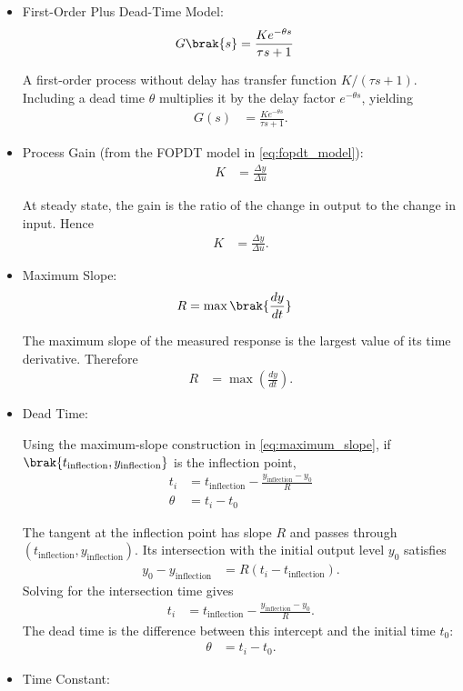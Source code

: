 \begin{enumerate}[label=\thesubsection.\arabic*, ref=\thesubsection.\theenumi,itemsep=0pt]
\begin{itemize}
\item First-Order Plus Dead-Time Model:
\begin{align}
G\brak{s}
&= \frac{Ke^{-\theta s}}{\tau s+1}
\label{eq:fopdt_model}
\end{align}


\solution
A first-order process without delay has transfer function $K/(\tau s+1)$. Including a dead time $\theta$ multiplies it by the delay factor $e^{-\theta s}$, yielding
\begin{align}
G(s)&=\frac{Ke^{-\theta s}}{\tau s+1}.
\end{align}
\item Process Gain (from the FOPDT model in \eqref{eq:fopdt_model}):
\begin{align}
K
&= \frac{\Delta y}{\Delta u}
\label{eq:process_gain}
\end{align}


\solution
At steady state, the gain is the ratio of the change in output to the change in input. Hence
\begin{align}
K&=\frac{\Delta y}{\Delta u}.
\end{align}
\item Maximum Slope:
\begin{align}
R
&= \max\brak{\frac{dy}{dt}}
\label{eq:maximum_slope}
\end{align}


\solution
The maximum slope of the measured response is the largest value of its time derivative. Therefore
\begin{align}
R&=\max\left(\frac{dy}{dt}\right).
\end{align}
\item Dead Time:

Using the maximum-slope construction in \eqref{eq:maximum_slope}, if $\brak{t_{\mathrm{inflection}},y_{\mathrm{inflection}}}$ is the inflection point,
\begin{align}
t_i
&= t_{\mathrm{inflection}}
-\frac{y_{\mathrm{inflection}}-y_0}{R}
\label{eq:dead_time_tangent}\\
\theta
&= t_i-t_0
\label{eq:dead_time}
\end{align}


\solution
The tangent at the inflection point has slope $R$ and passes through $(t_{\mathrm{inflection}},y_{\mathrm{inflection}})$. Its intersection with the initial output level $y_0$ satisfies
\begin{align}
y_0-y_{\mathrm{inflection}}
&=R(t_i-t_{\mathrm{inflection}}).
\end{align}
Solving for the intersection time gives
\begin{align}
t_i&=t_{\mathrm{inflection}}-\frac{y_{\mathrm{inflection}}-y_0}{R}.
\end{align}
The dead time is the difference between this intercept and the initial time $t_0$:
\begin{align}
\theta&=t_i-t_0.
\end{align}
\item Time Constant:


\end{itemize}
\end{enumerate}
